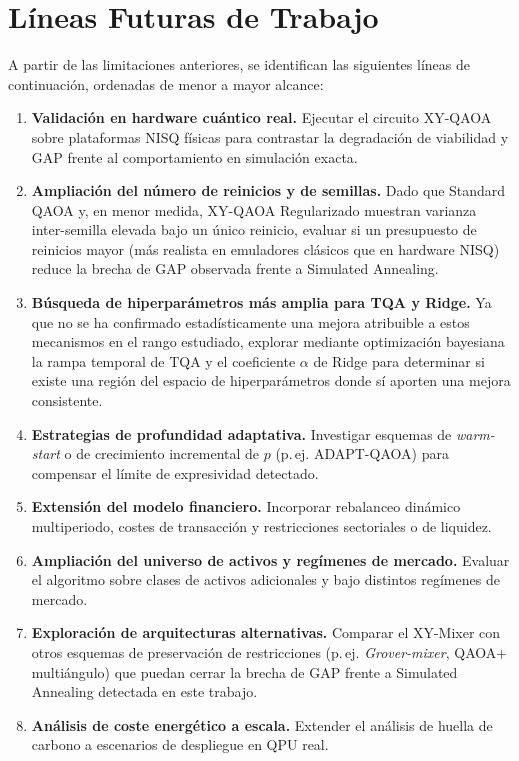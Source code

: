 \section{Líneas Futuras de Trabajo}
\label{sec:trabajo_futuro}

A partir de las limitaciones anteriores, se identifican las siguientes líneas de continuación, ordenadas de
menor a mayor alcance:

\begin{enumerate}
    \item \textbf{Validación en hardware cuántico real.} Ejecutar el circuito XY-QAOA sobre plataformas NISQ
    físicas para contrastar la degradación de viabilidad y GAP frente al comportamiento en simulación exacta.
    \item \textbf{Ampliación del número de reinicios y de semillas.} Dado que Standard QAOA y, en menor medida,
    XY-QAOA Regularizado muestran varianza inter-semilla elevada bajo un único reinicio, evaluar si un
    presupuesto de reinicios mayor (más realista en emuladores clásicos que en hardware NISQ) reduce la brecha de
    GAP observada frente a Simulated Annealing.
    \item \textbf{Búsqueda de hiperparámetros más amplia para TQA y Ridge.} Ya que no se ha confirmado
    estadísticamente una mejora atribuible a estos mecanismos en el rango estudiado, explorar mediante
    optimización bayesiana la rampa temporal de TQA y el coeficiente $\alpha$ de Ridge para determinar si existe
    una región del espacio de hiperparámetros donde sí aporten una mejora consistente.
    \item \textbf{Estrategias de profundidad adaptativa.} Investigar esquemas de \emph{warm-start} o de
    crecimiento incremental de $p$ (p.\,ej. ADAPT-QAOA) para compensar el límite de expresividad detectado.
    \item \textbf{Extensión del modelo financiero.} Incorporar rebalanceo dinámico multiperiodo, costes de
    transacción y restricciones sectoriales o de liquidez.
    \item \textbf{Ampliación del universo de activos y regímenes de mercado.} Evaluar el algoritmo sobre clases
    de activos adicionales y bajo distintos regímenes de mercado.
    \item \textbf{Exploración de arquitecturas alternativas.} Comparar el XY-Mixer con otros esquemas de
    preservación de restricciones (p.\,ej. \emph{Grover-mixer}, QAOA+ multiángulo) que puedan cerrar la brecha de
    GAP frente a Simulated Annealing detectada en este trabajo.
    \item \textbf{Análisis de coste energético a escala.} Extender el análisis de huella de carbono a escenarios
    de despliegue en QPU real.
\end{enumerate}

